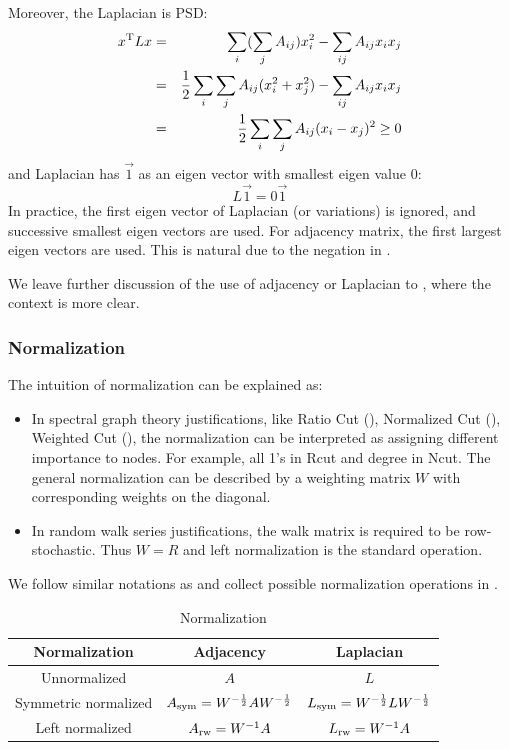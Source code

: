 Moreover, the Laplacian is PSD:
\begin{eqnarray}
	x^\mathrm{T}Lx &=& \sum_i (\sum_j{A_{ij}})x_i^2
		- \sum_{ij}A_{ij}x_ix_j \nonumber \\
		&=& \frac{1}{2} \sum_i\sum_j{A_{ij}}(x_i^2+x_j^2) 
		- \sum_{ij}A_{ij}x_ix_j \nonumber \\
		&=& \frac{1}{2} \sum_i\sum_j{A_{ij}}(x_i-x_j)^2 \ge 0
		\label{eq:lap_psd}
\end{eqnarray}
and Laplacian has $\vec{1}$ as an eigen vector with smallest eigen 
value 0:
\begin{equation}
	L \vec{1} = 0 \vec{1}
\end{equation}
In practice, the first eigen vector of Laplacian (or variations) is 
ignored, and successive smallest eigen vectors are used. For adjacency 
matrix, the first largest eigen vectors are used. This is natural 
due to the negation in \req{\ref{eq:def_lap}}. 

We leave further discussion of the use of adjacency or Laplacian 
to \rsec{\ref{sec:justification}}, where the context is more clear. 

\subsubsection{Normalization}

The intuition of normalization can be explained as:
\begin{itemize}
	\item In spectral graph theory justifications, like 
	Ratio Cut (\rsec{\ref{sec:rcut}}), 
	Normalized Cut (\rsec{\ref{sec:ncut}}), 
	Weighted Cut (\rsec{\ref{sec:wcut}}), 
	the normalization can be interpreted as assigning 
	different importance to nodes. For example, 
	all 1's in Rcut and degree in Ncut. The general normalization 
	can be described by a weighting matrix $W$ with corresponding 
	weights on the diagonal. 
	\item In random walk series justifications, the walk matrix 
	is required to be row-stochastic. Thus $W=R$ and left 
	normalization is the standard operation. 
\end{itemize}

We follow similar notations as \cite{von2007tutorial} and 
collect possible normalization operations in \rtbl{\ref{tbl:normalization}}. 

\begin{table}[htb]
	\label{tbl:normalization}
	\centering
	\caption{Normalization}
	\begin{tabular}{c|c|c}
		\hline
		Normalization & Adjacency & Laplacian \\
		\hline
		Unnormalized & $A$ & $L$ \\
		Symmetric normalized & $A_{\text{sym}}=W^{-\frac{1}{2}}AW^{-\frac{1}{2}}$ 
			& $L_{\text{sym}}=W^{-\frac{1}{2}}LW^{-\frac{1}{2}}$ \\
		Left normalized & $A_{\text{rw}}=W^{-1}A$ & $L_{\text{rw}}=W^{-1}A$ \footnotemark \\
		\hline
	\end{tabular}
\end{table}

